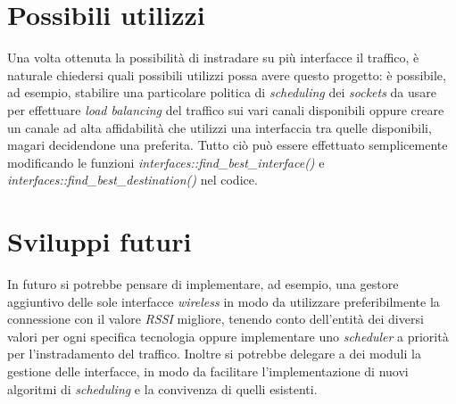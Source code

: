 \section{Possibili utilizzi}
Una volta ottenuta la possibilità di instradare su più interfacce il traffico, è naturale chiedersi quali possibili utilizzi possa avere questo progetto:
è possibile, ad esempio, stabilire una particolare politica di {\em scheduling} dei {\em sockets} da usare per effettuare {\em load balancing} del traffico sui vari canali disponibili oppure creare un canale ad alta affidabilità che utilizzi una interfaccia tra quelle disponibili, magari decidendone una preferita. Tutto ciò può essere effettuato semplicemente modificando le funzioni {\em interfaces::find\_best\_interface()} e {\em interfaces::find\_best\_destination()} nel codice.
\section{Sviluppi futuri}
In futuro si potrebbe pensare di implementare, ad esempio, una gestore aggiuntivo delle sole interfacce {\em wireless} in modo da utilizzare preferibilmente la connessione con il valore {\em RSSI} migliore, tenendo conto dell'entità dei diversi valori per ogni specifica tecnologia oppure implementare uno {\em scheduler} a priorità per l'instradamento del traffico. Inoltre si potrebbe delegare a dei moduli la gestione delle interfacce, in modo da facilitare l'implementazione di nuovi algoritmi di {\em scheduling} e la convivenza di quelli esistenti.
